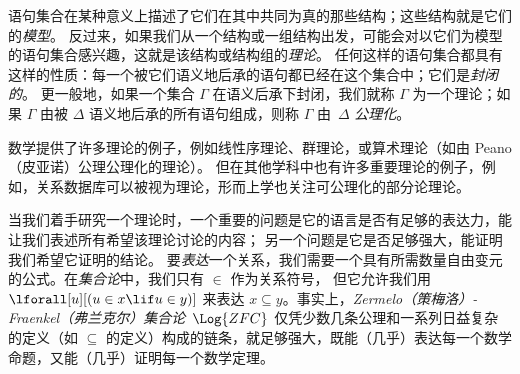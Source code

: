 语句集合在某种意义上描述了它们在其中共同为真的那些结构；这些结构就是它们的\emph{模型}。
反过来，如果我们从一个结构或一组结构出发，可能会对以它们为模型的语句集合感兴趣，这就是该结构或结构组的\emph{理论}。
任何这样的语句集合都具有这样的性质：每一个被它们语义地后承的语句都已经在这个集合中；它们是\emph{封闭的}。
更一般地，如果一个集合 $\Gamma$ 在语义后承下封闭，我们就称 $\Gamma$ 为一个理论；如果 $\Gamma$ 由被 $\Delta$ 语义地后承的所有语句组成，则称 $\Gamma$ 由~$\Delta$ \emph{公理化}。

数学提供了许多理论的例子，例如线性序理论、群理论，或算术理论（如由 Peano（皮亚诺）公理公理化的理论）。
但在其他学科中也有许多重要理论的例子，例如，关系数据库可以被视为理论，形而上学也关注可公理化的部分论理论。

当我们着手研究一个理论时，一个重要的问题是它的语言是否有足够的表达力，能让我们表述所有希望该理论讨论的内容；
另一个问题是它是否足够强大，能证明我们希望它证明的结论。
要\emph{表达}一个关系，我们需要一个具有所需数量自由变元的公式。在\emph{集合论}中，我们只有 $\in$ 作为关系符号，
但它允许我们用 $\lforall[u][(u \in x \lif u \in y)]$ 来表达 $x \subseteq y$。事实上，\emph{Zermelo（策梅洛）-Fraenkel（弗兰克尔）集合论}~$\Log{ZFC}$ 仅凭少数几条公理和一系列日益复杂的定义（如 $\subseteq$ 的定义）构成的链条，就足够强大，既能（几乎）表达每一个数学命题，又能（几乎）证明每一个数学定理。